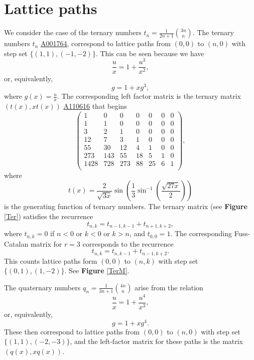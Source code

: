 \documentclass[12pt,reqno]{article}
\theoremstyle{definition}
\newcommand{\seqnum}[1]{\href{http://oeis.org/#1}{\underline{#1}}}
\begin{document}
\section{Lattice paths}
We consider the case of the ternary numbers $t_n=\frac{1}{2n+1}\binom{3n}{n}$.
The ternary numbers $t_n$ \seqnum{A001764},  correspond to lattice paths from $(0,0)$ to $(n,0)$ with step set $\{(1,1), (-1,-2)\}$. This can be seen because we have
$$\frac{u}{x}=1+\frac{u^3}{x^2},$$ or, equivalently,
$$g=1+xg^3,$$ where $g(x)=\frac{u}{x}$. The corresponding left factor matrix is the ternary matrix $(t(x), xt(x))$ \seqnum{A110616} that begins
$$\left(
\begin{array}{ccccccc}
 1 & 0 & 0 & 0 & 0 & 0 & 0 \\
 1 & 1 & 0 & 0 & 0 & 0 & 0 \\
 3 & 2 & 1 & 0 & 0 & 0 & 0 \\
12 & 7 & 3 & 1 & 0 & 0 & 0 \\
55 & 30 & 12 & 4 & 1 & 0 & 0 \\
273 & 143 & 55 & 18 & 5 & 1 & 0 \\
1428 & 728 & 273 & 88 & 25 & 6 & 1 \\
\end{array}\right),$$
where
$$t(x)=\frac{2}{\sqrt{3x}} \sin\left(\frac{1}{3}\sin^{-1}\left(\frac{\sqrt{27x}}{2}\right)\right)$$ is the generating function of ternary numbers. The ternary matrix (see \textbf{Figure} \ref{Ter}) satisfies the recurrence
$$t_{n,k}=t_{n-1,k-1}+t_{n+1,k+2},$$ where $t_{n,k}=0$ if $n<0$ or $k<0$ or $k>n$, and $t_{0,0}=1$. The corresponding Fuss-Catalan matrix for $r=3$ corresponds to the recurrence 
$$t_{n,k}=t_{n,k-1}+t_{n-1,k+2}.$$ This counts lattice paths form $(0,0)$ to $(n,k)$ with step set $\{(0,1), (1,-2)\}$. See \textbf{Figure} \ref{TerM}. 


The quaternary numbers $q_n=\frac{1}{3n+1}\binom{4n}{n}$ arise from the relation
$$\frac{u}{x}=1+\frac{u^4}{x^3},$$ or, equivalently,
$$g=1+xg^4.$$ These then correspond to lattice paths from $(0,0)$ to $(n,0)$ with step set $\{(1,1), (-2,-3)\}$, and the left-factor matrix for these paths is the matrix $(q(x), xq(x))$.
\end{document}

